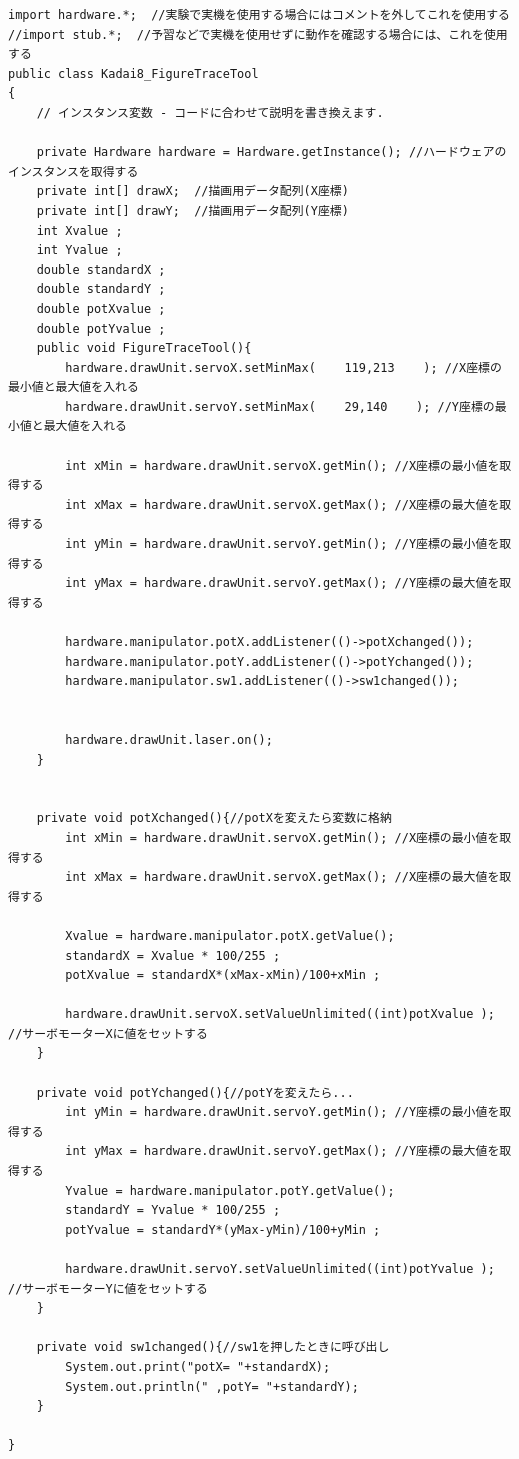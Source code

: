 \documentclass{jarticle}
\begin{document}
\begin{lstlisting}[caption=FigureTraceTool]
   import hardware.*;  //実験で実機を使用する場合にはコメントを外してこれを使用する
//import stub.*;  //予習などで実機を使用せずに動作を確認する場合には、これを使用する
public class Kadai8_FigureTraceTool
{
    // インスタンス変数 - コードに合わせて説明を書き換えます.
    
    private Hardware hardware = Hardware.getInstance(); //ハードウェアのインスタンスを取得する
    private int[] drawX;  //描画用データ配列(X座標)
    private int[] drawY;  //描画用データ配列(Y座標)
    int Xvalue ;
    int Yvalue ;
    double standardX ;
    double standardY ;
    double potXvalue ;
    double potYvalue ;
    public void FigureTraceTool(){
        hardware.drawUnit.servoX.setMinMax(    119,213    ); //X座標の最小値と最大値を入れる
        hardware.drawUnit.servoY.setMinMax(    29,140    ); //Y座標の最小値と最大値を入れる
        
        int xMin = hardware.drawUnit.servoX.getMin(); //X座標の最小値を取得する
        int xMax = hardware.drawUnit.servoX.getMax(); //X座標の最大値を取得する
        int yMin = hardware.drawUnit.servoY.getMin(); //Y座標の最小値を取得する
        int yMax = hardware.drawUnit.servoY.getMax(); //Y座標の最大値を取得する
        
        hardware.manipulator.potX.addListener(()->potXchanged());
        hardware.manipulator.potY.addListener(()->potYchanged());
        hardware.manipulator.sw1.addListener(()->sw1changed());
        
        
        hardware.drawUnit.laser.on();
    }


    private void potXchanged(){//potXを変えたら変数に格納
        int xMin = hardware.drawUnit.servoX.getMin(); //X座標の最小値を取得する
        int xMax = hardware.drawUnit.servoX.getMax(); //X座標の最大値を取得する
        
        Xvalue = hardware.manipulator.potX.getValue();
        standardX = Xvalue * 100/255 ;
        potXvalue = standardX*(xMax-xMin)/100+xMin ;
        
        hardware.drawUnit.servoX.setValueUnlimited((int)potXvalue );         //サーボモーターXに値をセットする
    }
    
    private void potYchanged(){//potYを変えたら...
        int yMin = hardware.drawUnit.servoY.getMin(); //Y座標の最小値を取得する
        int yMax = hardware.drawUnit.servoY.getMax(); //Y座標の最大値を取得する
        Yvalue = hardware.manipulator.potY.getValue();
        standardY = Yvalue * 100/255 ;
        potYvalue = standardY*(yMax-yMin)/100+yMin ;
        
        hardware.drawUnit.servoY.setValueUnlimited((int)potYvalue );      //サーボモーターYに値をセットする
    }
    
    private void sw1changed(){//sw1を押したときに呼び出し
        System.out.print("potX= "+standardX);
        System.out.println(" ,potY= "+standardY);
    }
    
}
\end{lstlisting}
\end{document}
